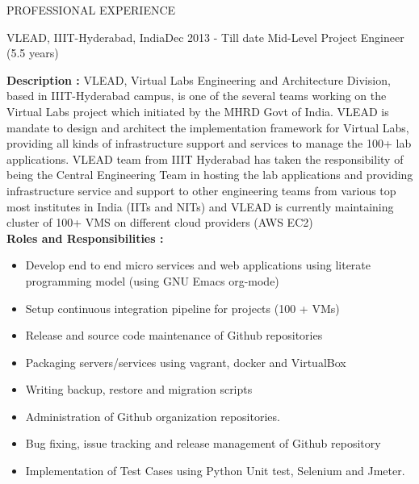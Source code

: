 \documentclass{resume} %
\begin{document}
\begin{rSection}{PROFESSIONAL EXPERIENCE}
  
  \begin{rSubsection}
    {VLEAD, IIIT-Hyderabad, India}{Dec 2013 - Till date}
    {Mid-Level Project Engineer} {(5.5 years)}

    \textbf{Description
      :} VLEAD, Virtual Labs Engineering and Architecture Division,
    based in IIIT-Hyderabad campus, is one of the several teams
    working on the Virtual Labs project which initiated by the MHRD
    Govt of India. VLEAD is mandate to design and architect the
    implementation framework for Virtual Labs, providing all kinds of
    infrastructure support and services to manage the 100+ lab
    applications. VLEAD team from IIIT Hyderabad has taken the
    responsibility of being the Central Engineering Team in hosting
    the lab applications and providing infrastructure service and
    support to other engineering teams from various top most
    institutes in India (IITs and NITs) and VLEAD is currently
    maintaining cluster of 100+ VMS on different cloud providers (AWS
    EC2) \\
    \break
    \textbf{Roles and Responsibilities :}

    \begin{itemize}
      
    \item Develop end to end micro services and web
      applications using literate programming model (using
      GNU Emacs org-mode)

    \item Setup continuous integration pipeline for projects
      (100 + VMs)

    \item Release and source code maintenance of Github
      repositories

    \item Packaging servers/services using vagrant,
      docker and VirtualBox

    \item Writing backup, restore and migration scripts
      
    \item Administration of Github organization repositories.

    \item Bug fixing, issue tracking and release management of Github
      repository

    \item Implementation of Test Cases using Python Unit
      test, Selenium and Jmeter.


\end{itemize}
\end{rSubsection}
\end{rSection}
\end{document}
